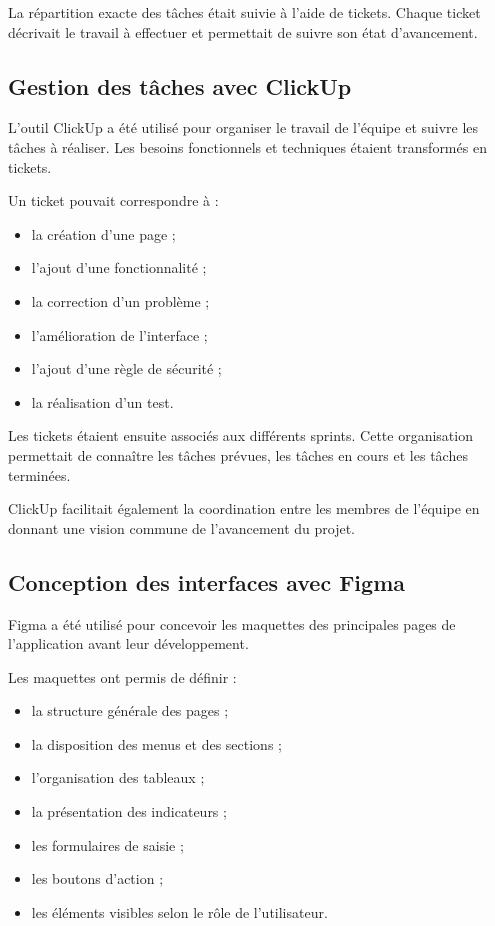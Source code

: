 \documentclass{rapportENSIAS}
\begin{document}
La répartition exacte des tâches était suivie à l’aide de tickets. Chaque ticket décrivait le travail à effectuer et permettait de suivre son état d’avancement.

\subsection{Gestion des tâches avec ClickUp}

L’outil ClickUp a été utilisé pour organiser le travail de l’équipe et suivre les tâches à réaliser. Les besoins fonctionnels et techniques étaient transformés en tickets.

Un ticket pouvait correspondre à :

\begin{itemize}
\item la création d’une page ;
\item l’ajout d’une fonctionnalité ;
\item la correction d’un problème ;
\item l’amélioration de l’interface ;
\item l’ajout d’une règle de sécurité ;
\item la réalisation d’un test.
\end{itemize}

Les tickets étaient ensuite associés aux différents sprints. Cette organisation permettait de connaître les tâches prévues, les tâches en cours et les tâches terminées.

ClickUp facilitait également la coordination entre les membres de l’équipe en donnant une vision commune de l’avancement du projet.

\subsection{Conception des interfaces avec Figma}

Figma a été utilisé pour concevoir les maquettes des principales pages de l’application avant leur développement.

Les maquettes ont permis de définir :

\begin{itemize}
\item la structure générale des pages ;
\item la disposition des menus et des sections ;
\item l’organisation des tableaux ;
\item la présentation des indicateurs ;
\item les formulaires de saisie ;
\item les boutons d’action ;
\item les éléments visibles selon le rôle de l’utilisateur.
\end{itemize}
\end{document}
